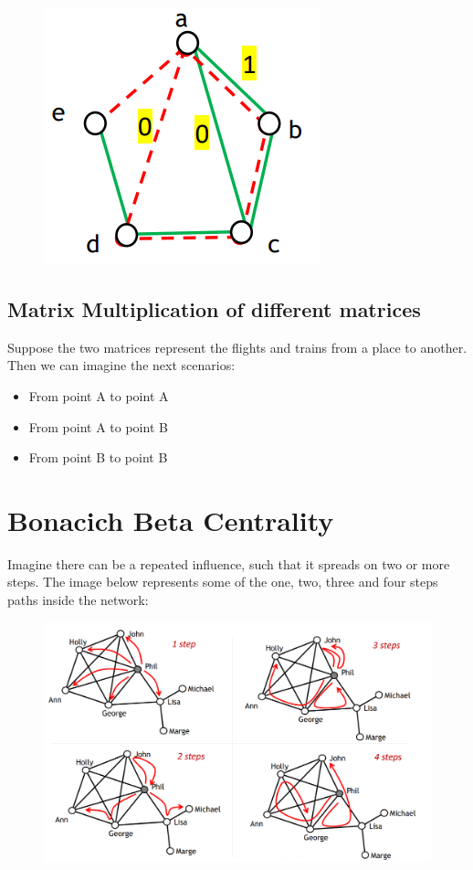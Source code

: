 \documentclass[
  notitlepage,
  onecolumn,
  openany]{book}
\providecommand{\tightlist}{%
  \setlength{\itemsep}{0pt}\setlength{\parskip}{0pt}}
\begin{document}
\begin{figure}[h!]

{\centering \includegraphics[width=0.5\linewidth]{images/05-Matrices and Beta centrality/Untitled 2} 

}

\end{figure}

\hypertarget{matrix-multiplication-of-different-matrices}{%
\subsection{Matrix Multiplication of different matrices}\label{matrix-multiplication-of-different-matrices}}

Suppose the two matrices represent the flights and trains from a place to another. Then we can imagine the next scenarios:

\begin{itemize}
\tightlist
\item
  From point A to point A
\item
  From point A to point B
\item
  From point B to point B
\end{itemize}

\hypertarget{bonacich-beta-centrality-1}{%
\section{Bonacich Beta Centrality}\label{bonacich-beta-centrality-1}}

Imagine there can be a repeated influence, such that it spreads on two or more steps. The image below represents some of the one, two, three and four steps paths inside the network:

\begin{figure}[h!]

{\centering \includegraphics[width=0.5\linewidth]{images/05-Matrices and Beta centrality/Untitled 3} 

}

\end{figure}
\end{document}

